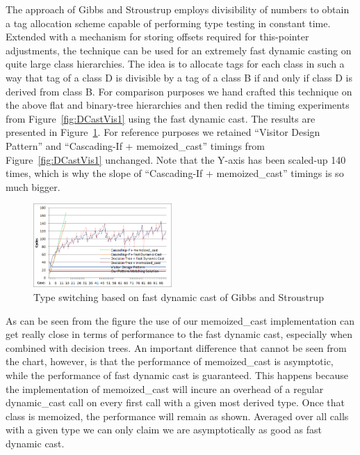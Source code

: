 \documentclass[preprint]{sigplanconf}
\begin{document}
The approach of Gibbs and Stroustrup employs divisibility of numbers to obtain a 
tag allocation scheme capable of performing type testing in constant time. 
Extended with a mechanism for storing offsets required for this-pointer 
adjustments, the technique can be used for an extremely fast dynamic casting on 
quite large class hierarchies\cite{FastDynCast}. The idea is to allocate tags 
for each class in such a way that tag of a class D is divisible by a tag of a 
class B if and only if class D is derived from class B. For comparison purposes 
we hand crafted this technique on the above flat and binary-tree hierarchies and 
then redid the timing experiments from Figure~\ref{fig:DCastVis1} using the fast 
dynamic cast. The results are presented in Figure~\ref{fig:DCastVis2}. For 
reference purposes we retained ``Visitor Design Pattern'' and ``Cascading-If + 
memoized\_cast'' timings from Figure~\ref{fig:DCastVis1} unchanged. Note that 
the Y-axis has been scaled-up 140 times, which is why the slope of 
``Cascading-If + memoized\_cast'' timings is so much bigger.

\begin{figure}[htbp]
  \centering
    \includegraphics[width=0.47\textwidth]{DCast-vs-Visitors2.png}
  \caption{Type switching based on fast dynamic cast of Gibbs and Stroustrup\cite{FastDynCast}}
  \label{fig:DCastVis2}
\end{figure}

As can be seen from the figure the use of our memoized\_cast implementation can 
get really close in terms of performance to the fast dynamic cast, especially 
when combined with decision trees. An important difference that cannot be seen 
from the chart, however, is that the performance of memoized\_cast is 
asymptotic, while the performance of fast dynamic cast is guaranteed. This 
happens because the implementation of memoized\_cast will incure an overhead of 
a regular dynamic\_cast call on every first call with a given most derived type. 
Once that class is memoized, the performance will remain as shown. Averaged over 
all calls with a given type we can only claim we are asymptotically as good as 
fast dynamic cast.
\end{document}
